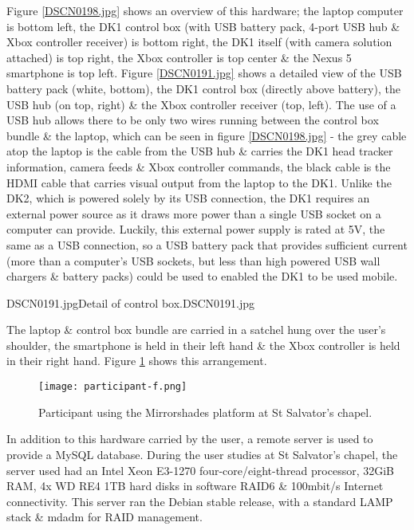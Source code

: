 Figure \ref{DSCN0198.jpg} shows an overview of this hardware; the laptop computer is bottom left, the DK1 control box (with USB battery pack, 4-port USB hub \& Xbox controller receiver) is bottom right, the DK1 itself (with camera solution attached) is top right, the Xbox controller is top center \& the Nexus 5 smartphone is top left. Figure \ref{DSCN0191.jpg} shows a detailed view of the USB battery pack (white, bottom), the DK1 control box (directly above battery), the USB hub (on top, right) \& the Xbox controller receiver (top, left). The use of a USB hub allows there to be only two wires running between the control box bundle \& the laptop, which can be seen in figure \ref{DSCN0198.jpg} - the grey cable atop the laptop is the cable from the USB hub \& carries the DK1 head tracker information, camera feeds \& Xbox controller commands, the black cable is the HDMI cable that carries visual output from the laptop to the DK1. Unlike the DK2, which is powered solely by its USB connection, the DK1 requires an external power source as it draws more power than a single USB socket on a computer can provide. Luckily, this external power supply is rated at 5V, the same as a USB connection, so a USB battery pack that provides sufficient current (more than a computer's USB sockets, but less than high powered USB wall chargers \& battery packs) could be used to enabled the DK1 to be used mobile.

       {DSCN0191.jpg}{Detail of control box.}{DSCN0191.jpg}

The laptop \& control box bundle are carried in a satchel hung over the user's shoulder, the smartphone is held in their left hand \& the Xbox controller is held in their right hand. Figure \ref{participant-f.png} shows this arrangement.

\begin{figure}[h]
	\begin{center}
		\texttt{[image: participant-f.png]}
		\caption{Participant using the Mirrorshades platform at St Salvator's chapel.}
		\label{participant-f.png}
	\end{center}
\end{figure}

In addition to this hardware carried by the user, a remote server is used to provide a MySQL database. During the user studies at St Salvator's chapel, the server used had an Intel Xeon E3-1270 four-core/eight-thread processor, 32GiB RAM, 4x WD RE4 1TB hard disks in software RAID6 \& 100mbit/s Internet connectivity. This server ran the Debian stable release, with a standard LAMP stack \& mdadm for RAID management.

